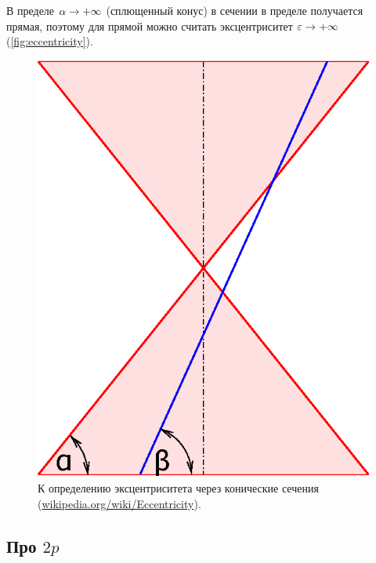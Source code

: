 \documentclass[a4paper,12pt]{article}
\begin{document}
  В пределе $\alpha \hm\to +\infty$ (сплющенный конус) в сечении в пределе получается прямая, поэтому для прямой можно считать эксцентриситет $\eps \hm\to +\infty$ (\ref{fig:eccentricity}).
  
  
  \begin{figure}[h]
    \centering
    
    \begin{minipage}[c]{0.25\textwidth}
      \includegraphics[width=\textwidth]{eccentricity_definition}
    \end{minipage}\hfill
    \begin{minipage}[c]{0.75\textwidth}
      \caption{К определению эксцентриситета через конические сечения (\href{https://en.wikipedia.org/wiki/Eccentricity_(mathematics)}{wikipedia.org/wiki/Eccentricity}).}
      \label{fig:eccentricity_definition}
    \end{minipage}
  \end{figure}
  
  
  \subsection{Про $2p$}
  
\end{document}
